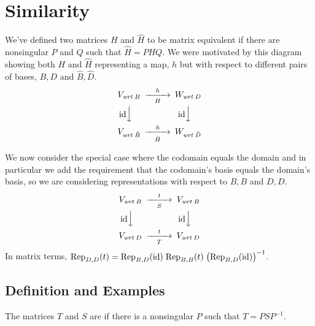 \section{Similarity}
We've defined two matrices \( H \) and \( \hat{H} \) to be
matrix equivalent if there are nonsingular \( P \) and \( Q \)
such that \( \hat{H}=PHQ \).
We were motivated by this diagram
showing both $H$ and $\hat{H}$ representing a map, 
$h$ but with respect to different
pairs of bases, $B,D$ and $\hat{B},\hat{D}$.
\begin{equation*}
  \begin{CD}
    V_{\wrt{B}}                   @>h>H>        W_{\wrt{D}}       \\
    @V{\scriptstyle\identity} VV              @V{\scriptstyle\identity} VV \\
    V_{\wrt{\hat{B}}}             @>h>\hat{H}>  W_{\wrt{\hat{D}}}
  \end{CD}
\end{equation*}

We now consider the special case
where the codomain equals the domain and in particular we add the requirement
that the codomain's basis equals the domain's basis,
so we are considering representations with respect to 
$B,B$ and $D,D$.
\begin{equation*}
  \begin{CD}
    V_{\wrt{B}}                   @>t>S>        V_{\wrt{B}}       \\
    @V{\scriptstyle\identity} VV              @V{\scriptstyle\identity} VV \\
    V_{\wrt{D}}                   @>t>T>        V_{\wrt{D}}
  \end{CD}
\end{equation*}
In matrix terms, 
\(\rep{t}{D,D}
  =\rep{\identity}{B,D}\;\rep{t}{B,B}\;\bigl(\rep{\identity}{B,D}\bigr)^{-1} \).



\subsection{Definition and Examples}
\begin{definition}
The matrices  \( T \) and $S$ are 
%
if there is a nonsingular \( P \) such that
$
  T=PSP^{-1}
$.
\end{definition}

